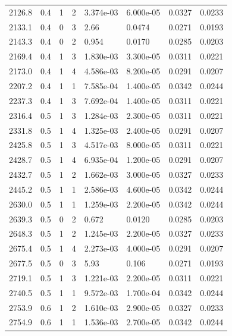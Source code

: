 \documentclass[preview]{standalone}
\begin{document}
{{{\begin{tabular}{L{1.2cm}C{1.2cm} C{0.3cm}C{0.5cm} C{1.4cm}C{1.4cm} C{1.4cm}C{1.4cm}}
  2126.8  &   0.4  & 1     &  2 &  3.374e-03  & 6.000e-05  & 0.0327 &  0.0233   \\ 
  2133.1  &   0.4  & 0     &  3 &  2.66  & 0.0474  & 0.0271 &  0.0193   \\ 
  2143.3  &   0.4  & 0     &  2 &  0.954  & 0.0170  & 0.0285 &  0.0203   \\ 
  2169.4  &   0.4  & 1     &  3 &  1.830e-03  & 3.300e-05  & 0.0311 &  0.0221   \\ 
  2173.0  &   0.4  & 1     &  4 &  4.586e-03  & 8.200e-05  & 0.0291 &  0.0207   \\ 
  2207.2  &   0.4  & 1     &  1 &  7.585e-04  & 1.400e-05  & 0.0342 &  0.0244   \\ 
  2237.3  &   0.4  & 1     &  3 &  7.692e-04  & 1.400e-05  & 0.0311 &  0.0221   \\ 
  2316.4  &   0.5  & 1     &  3 &  1.284e-03  & 2.300e-05  & 0.0311 &  0.0221   \\ 
  2331.8  &   0.5  & 1     &  4 &  1.325e-03  & 2.400e-05  & 0.0291 &  0.0207   \\ 
  2425.8  &   0.5  & 1     &  3 &  4.517e-03  & 8.000e-05  & 0.0311 &  0.0221   \\ 
  2428.7  &   0.5  & 1     &  4 &  6.935e-04  & 1.200e-05  & 0.0291 &  0.0207   \\ 
  2432.7  &   0.5  & 1     &  2 &  1.662e-03  & 3.000e-05  & 0.0327 &  0.0233   \\ 
  2445.2  &   0.5  & 1     &  1 &  2.586e-03  & 4.600e-05  & 0.0342 &  0.0244   \\ 
  2630.0  &   0.5  & 1     &  1 &  1.259e-03  & 2.200e-05  & 0.0342 &  0.0244   \\ 
  2639.3  &   0.5  & 0     &  2 &  0.672  & 0.0120  & 0.0285 &  0.0203   \\ 
  2648.3  &   0.5  & 1     &  2 &  1.245e-03  & 2.200e-05  & 0.0327 &  0.0233   \\ 
  2675.4  &   0.5  & 1     &  4 &  2.273e-03  & 4.000e-05  & 0.0291 &  0.0207   \\ 
  2677.5  &   0.5  & 0     &  3 &  5.93  & 0.106  & 0.0271 &  0.0193   \\ 
  2719.1  &   0.5  & 1     &  3 &  1.221e-03  & 2.200e-05  & 0.0311 &  0.0221   \\ 
  2740.5  &   0.5  & 1     &  1 &  9.572e-03  & 1.700e-04  & 0.0342 &  0.0244   \\ 
  2753.9  &   0.6  & 1     &  2 &  1.610e-03  & 2.900e-05  & 0.0327 &  0.0233   \\ 
  2754.9  &   0.6  & 1     &  1 &  1.536e-03  & 2.700e-05  & 0.0342 &  0.0244   \\ 

\end{tabular}}}}
\end{document}

